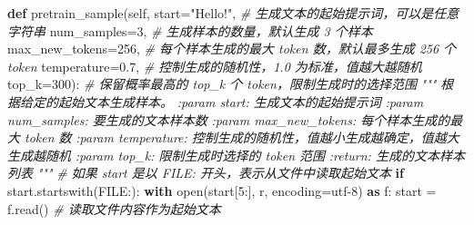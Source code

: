 \documentclass[
]{article}
\newenvironment{Shaded}{}{}
\newcommand{\BuiltInTok}[1]{\textcolor[rgb]{0.00,0.50,0.00}{#1}}
\newcommand{\CommentTok}[1]{\textcolor[rgb]{0.38,0.63,0.69}{\textit{#1}}}
\newcommand{\ControlFlowTok}[1]{\textcolor[rgb]{0.00,0.44,0.13}{\textbf{#1}}}
\newcommand{\DecValTok}[1]{\textcolor[rgb]{0.25,0.63,0.44}{#1}}
\newcommand{\FloatTok}[1]{\textcolor[rgb]{0.25,0.63,0.44}{#1}}
\newcommand{\ImportTok}[1]{\textcolor[rgb]{0.00,0.50,0.00}{\textbf{#1}}}
\newcommand{\KeywordTok}[1]{\textcolor[rgb]{0.00,0.44,0.13}{\textbf{#1}}}
\newcommand{\NormalTok}[1]{#1}
\newcommand{\OperatorTok}[1]{\textcolor[rgb]{0.40,0.40,0.40}{#1}}
\newcommand{\StringTok}[1]{\textcolor[rgb]{0.25,0.44,0.63}{#1}}
\newcommand{\VariableTok}[1]{\textcolor[rgb]{0.10,0.09,0.49}{#1}}
\begin{document}
\begin{Shaded}
\begin{Highlighting}[]
    \KeywordTok{def}\NormalTok{ pretrain\_sample(}\VariableTok{self}\NormalTok{, }
\NormalTok{               start}\OperatorTok{=}\StringTok{"Hello!"}\NormalTok{,  }\CommentTok{\# 生成文本的起始提示词，可以是任意字符串}
\NormalTok{               num\_samples}\OperatorTok{=}\DecValTok{3}\NormalTok{,  }\CommentTok{\# 生成样本的数量，默认生成 3 个样本}
\NormalTok{               max\_new\_tokens}\OperatorTok{=}\DecValTok{256}\NormalTok{,  }\CommentTok{\# 每个样本生成的最大 token 数，默认最多生成 256 个 token}
\NormalTok{               temperature}\OperatorTok{=}\FloatTok{0.7}\NormalTok{,  }\CommentTok{\# 控制生成的随机性，1.0 为标准，值越大越随机}
\NormalTok{               top\_k}\OperatorTok{=}\DecValTok{300}\NormalTok{):  }\CommentTok{\# 保留概率最高的 top\_k 个 token，限制生成时的选择范围}
        \CommentTok{"""}
\CommentTok{        根据给定的起始文本生成样本。}
\CommentTok{        }
\CommentTok{        :param start: 生成文本的起始提示词}
\CommentTok{        :param num\_samples: 要生成的文本样本数}
\CommentTok{        :param max\_new\_tokens: 每个样本生成的最大 token 数}
\CommentTok{        :param temperature: 控制生成的随机性，值越小生成越确定，值越大生成越随机}
\CommentTok{        :param top\_k: 限制生成时选择的 token 范围}
\CommentTok{        :return: 生成的文本样本列表}
\CommentTok{        """}
        \CommentTok{\# 如果 start 是以 \textquotesingle{}FILE:\textquotesingle{} 开头，表示从文件中读取起始文本}
        \ControlFlowTok{if}\NormalTok{ start.startswith(}\StringTok{\textquotesingle{}FILE:\textquotesingle{}}\NormalTok{):}
            \ControlFlowTok{with} \BuiltInTok{open}\NormalTok{(start[}\DecValTok{5}\NormalTok{:], }\StringTok{\textquotesingle{}r\textquotesingle{}}\NormalTok{, encoding}\OperatorTok{=}\StringTok{\textquotesingle{}utf{-}8\textquotesingle{}}\NormalTok{) }\ImportTok{as}\NormalTok{ f:}
\NormalTok{                start }\OperatorTok{=}\NormalTok{ f.read()  }\CommentTok{\# 读取文件内容作为起始文本}
        

\end{Highlighting}
\end{Shaded}
\end{document}
